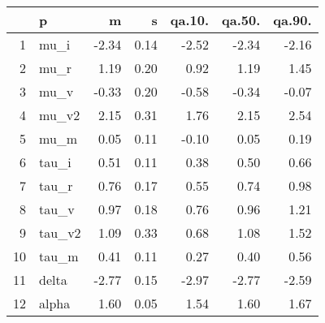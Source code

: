 \begin{table}[ht]
\centering
\begin{tabular}{rlrrrrr}
  \hline
 & p & m & s & qa.10. & qa.50. & qa.90. \\ 
  \hline
1 & mu\_i & -2.34 & 0.14 & -2.52 & -2.34 & -2.16 \\ 
  2 & mu\_r & 1.19 & 0.20 & 0.92 & 1.19 & 1.45 \\ 
  3 & mu\_v & -0.33 & 0.20 & -0.58 & -0.34 & -0.07 \\ 
  4 & mu\_v2 & 2.15 & 0.31 & 1.76 & 2.15 & 2.54 \\ 
  5 & mu\_m & 0.05 & 0.11 & -0.10 & 0.05 & 0.19 \\ 
  6 & tau\_i & 0.51 & 0.11 & 0.38 & 0.50 & 0.66 \\ 
  7 & tau\_r & 0.76 & 0.17 & 0.55 & 0.74 & 0.98 \\ 
  8 & tau\_v & 0.97 & 0.18 & 0.76 & 0.96 & 1.21 \\ 
  9 & tau\_v2 & 1.09 & 0.33 & 0.68 & 1.08 & 1.52 \\ 
  10 & tau\_m & 0.41 & 0.11 & 0.27 & 0.40 & 0.56 \\ 
  11 & delta & -2.77 & 0.15 & -2.97 & -2.77 & -2.59 \\ 
  12 & alpha & 1.60 & 0.05 & 1.54 & 1.60 & 1.67 \\ 
   \hline
\end{tabular}
\label{tab:param}
\end{table}

